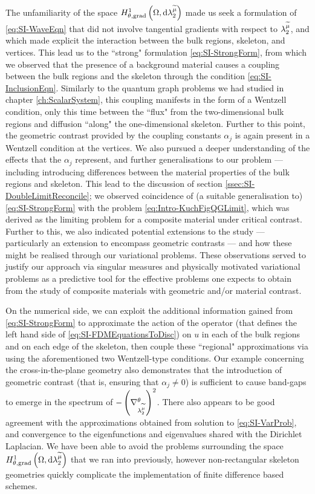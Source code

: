 The unfamiliarity of the space $H^1_{\theta, \mathrm{grad}}\left( \Omega, \mathrm{d}\lambda_2^{\widetilde{\mu}} \right)$ made us seek a formulation of \eqref{eq:SI-WaveEqn} that did not involve tangential gradients with respect to $\lambda_2^{\widetilde{\mu}}$, and which made explicit the interaction between the bulk regions, skeleton, and vertices.
This lead us to the ``strong" formulation \eqref{eq:SI-StrongForm}, from which we observed that the presence of a background material causes a coupling between the bulk regions and the skeleton through the condition \eqref{eq:SI-InclusionEqn}.
Similarly to the quantum graph problems we had studied in chapter \ref{ch:ScalarSystem}, this coupling manifests in the form of a Wentzell condition, only this time between the ``flux" from the two-dimensional bulk regions and diffusion ``along" the one-dimensional skeleton.
Further to this point, the geometric contrast provided by the coupling constants $\alpha_j$ is again present in a Wentzell condition at the vertices.
We also pursued a deeper understanding of the effects that the $\alpha_j$ represent, and further generalisations to our problem --- including introducing differences between the material properties of the bulk regions and skeleton.
This lead to the discussion of section \ref{ssec:SI-DoubleLimitReconcile}; we observed coincidence of (a suitable generalisation to) \eqref{eq:SI-StrongForm} with the problem \eqref{eq:Intro-KuchFigQGLimit}, which was derived as the limiting problem for a composite material under critical contrast.
Further to this, we also indicated potential extensions to the study \cite{figotin1998spectral} --- particularly an extension to encompass geometric contrasts --- and how these might be realised through our variational problems.
These observations served to justify our approach via singular measures and physically motivated variational problems as a predictive tool for the effective problems one expects to obtain from the study of composite materials with geometric and/or material contrast.

On the numerical side, we can exploit the additional information gained from \eqref{eq:SI-StrongForm} to approximate the action of the operator (that defines the left hand side of \eqref{eq:SI-FDMEquationsToDisc}) on $u$ in each of the bulk regions and on each edge of the skeleton, then couple these ``regional" approximations via using the aforementioned two Wentzell-type conditions.
Our example concerning the cross-in-the-plane geometry also demonstrates that the introduction of geometric contrast (that is, ensuring that $\alpha_j\neq0$) is sufficient to cause band-gaps to emerge in the spectrum of $-\left( \nabla^{\theta}_{\lambda_2^{\widetilde{\mu}}} \right)^2$.
There also appears to be good agreement with the approximations obtained from solution to \eqref{eq:SI-VarProb}, and convergence to the eigenfunctions and eigenvalues shared with the Dirichlet Laplacian.
We have been able to avoid the problems surrounding the space $H^1_{\theta, \mathrm{grad}}\left( \Omega, \mathrm{d}\lambda_2^{\widetilde{\mu}} \right)$ that we ran into previously, however non-rectangular skeleton geometries quickly complicate the implementation of finite difference based schemes.

